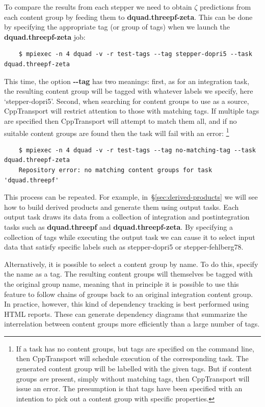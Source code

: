 \documentclass[11pt,a4paper]{article}
\newcommand{\repoobject}[1]{{\ttfamily\bfseries\small #1}}
\newcommand{\packagefont}{\sffamily}
\newcommand{\CppTransport}{{\packagefont CppTransport}}
\newcommand{\option}[1]{{\ttfamily\bfseries\small #1}}
\newcommand{\semibold}[1]{{\fontseries{b}\selectfont{#1}}}
\newcommand{\para}[1]{\par\vspace{2mm}\noindent\semibold{{#1.}---}\ignorespaces}
\newcommand{\grouptag}[1]{\textsf{{#1}}}
\begin{document}
To compare the results from each stepper we need to obtain
$\zeta$ predictions from each content group
by feeding them to
\repoobject{dquad.threepf-zeta}.
This can be done by specifying the appropriate tag (or group of tags)
when we launch the \repoobject{dquad.threepf-zeta} job:
\begin{verbatim}
    $ mpiexec -n 4 dquad -v -r test-tags --tag stepper-dopri5 --task dquad.threepf-zeta    
\end{verbatim}
This time, the option
\option{{-}{-}tag} has two meanings:
first, as for an integration task,
the resulting content group will be
tagged with whatever labels we specify, here
`\grouptag{stepper-dopri5}'.
Second, when searching for content groups to use as a source,
{\CppTransport} will restrict attention to those with matching tags.
If multiple tags are specified then {\CppTransport} will attempt to match
them all,
and if no suitable content groups are found
then the task will fail with an error:%
    \footnote{If a task has no content groups, but tags are specified on the
    command line, then {\CppTransport} will schedule execution of the corresponding
    task. The generated content group will be labelled with the given tags.
    But if content groups \emph{are} present, simply without matching tags, then
    {\CppTransport} will issue an error.
    The presumption is that tags
    have been specified with an intention to pick out
    a content group with specific properties.}
\begin{verbatim}
    $ mpiexec -n 4 dquad -v -r test-tags --tag no-matching-tag --task dquad.threepf-zeta 
    Repository error: no matching content groups for task 'dquad.threepf'    
\end{verbatim}

This process can be repeated.
For example, in~\S\ref{sec:derived-products}
we will see how to build derived products and generate them using output tasks.
Each output task draws its data from a collection of integration and
postintegration tasks such as \repoobject{dquad.threepf}
and \repoobject{dquad.threepf-zeta}.
By specifying a collection of tags while executing the output task we can cause it
to select input data that satisfy specific labels
such as 
\grouptag{stepper-dopri5}
or
\grouptag{stepper-fehlberg78}.

\para{Selecting a content group by name}
Alternatively, it is possible to select a content group by name.
To do this,
specify the name as a tag.
The resulting content groups will
themselves be tagged with the original group name,
meaning that in principle it is possible to use this feature
to follow chains
of groups back to an original integration content group.
In practice, however, this kind of dependency tracking is best performed
using HTML reports. These can generate dependency diagrams that summarize the
interrelation between content groups more efficiently than a large number of tags.
\end{document}
